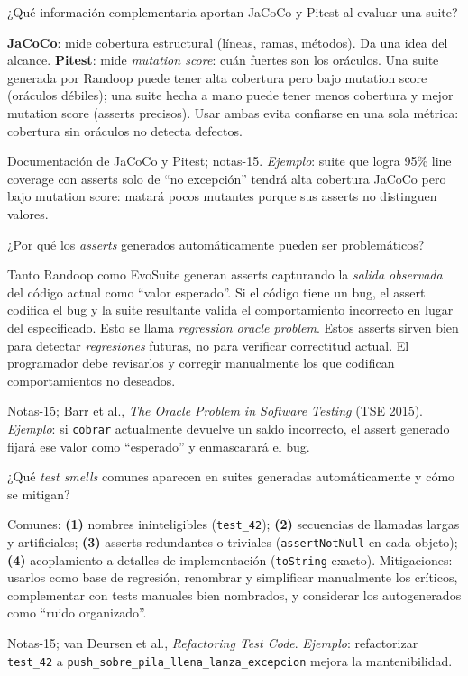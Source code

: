 \documentclass[11pt,a4paper]{article}
\newcounter{preg}
\newcommand{\qa}[3]{%
  \stepcounter{preg}%
  \vspace{0.4em}
  \begin{preguntabox}{\thepreg}
  #1
  \end{preguntabox}
  \begin{respuestabox}
  #2
  \end{respuestabox}
  \begin{refbox}
  #3
  \end{refbox}
  \vspace{0.6em}
}
\begin{document}
\qa{¿Qué información complementaria aportan JaCoCo y Pitest al evaluar una suite?}
{\textbf{JaCoCo}: mide cobertura estructural (líneas, ramas, métodos). Da una idea del alcance. \textbf{Pitest}: mide \emph{mutation score}: cuán fuertes son los oráculos. Una suite generada por Randoop puede tener alta cobertura pero bajo mutation score (oráculos débiles); una suite hecha a mano puede tener menos cobertura y mejor mutation score (asserts precisos). Usar ambas evita confiarse en una sola métrica: cobertura sin oráculos no detecta defectos.}
{Documentación de JaCoCo y Pitest; notas-15. \emph{Ejemplo}: suite que logra 95\% line coverage con asserts solo de ``no excepción'' tendrá alta cobertura JaCoCo pero bajo mutation score: matará pocos mutantes porque sus asserts no distinguen valores.}

\qa{¿Por qué los \emph{asserts} generados automáticamente pueden ser problemáticos?}
{Tanto Randoop como EvoSuite generan asserts capturando la \emph{salida observada} del código actual como ``valor esperado''. Si el código tiene un bug, el assert codifica el bug y la suite resultante valida el comportamiento incorrecto en lugar del especificado. Esto se llama \emph{regression oracle problem}. Estos asserts sirven bien para detectar \emph{regresiones} futuras, no para verificar correctitud actual. El programador debe revisarlos y corregir manualmente los que codifican comportamientos no deseados.}
{Notas-15; Barr et al., \emph{The Oracle Problem in Software Testing} (TSE 2015). \emph{Ejemplo}: si \texttt{cobrar} actualmente devuelve un saldo incorrecto, el assert generado fijará ese valor como ``esperado'' y enmascarará el bug.}

\qa{¿Qué \emph{test smells} comunes aparecen en suites generadas automáticamente y cómo se mitigan?}
{Comunes: \textbf{(1)} nombres ininteligibles (\texttt{test\_42}); \textbf{(2)} secuencias de llamadas largas y artificiales; \textbf{(3)} asserts redundantes o triviales (\texttt{assertNotNull} en cada objeto); \textbf{(4)} acoplamiento a detalles de implementación (\texttt{toString} exacto). Mitigaciones: usarlos como base de regresión, renombrar y simplificar manualmente los críticos, complementar con tests manuales bien nombrados, y considerar los autogenerados como ``ruido organizado''.}
{Notas-15; van Deursen et al., \emph{Refactoring Test Code}. \emph{Ejemplo}: refactorizar \texttt{test\_42} a \texttt{push\_sobre\_pila\_llena\_lanza\_excepcion} mejora la mantenibilidad.}
\end{document}

